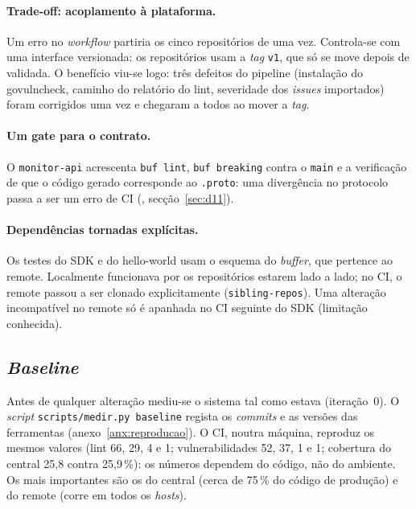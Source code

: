 \paragraph{Trade-off: acoplamento à plataforma.}
Um erro no \emph{workflow} partiria os cinco repositórios de uma vez. Controla-se com uma interface versionada:
os repositórios usam a \emph{tag} \texttt{v1}, que só se move depois de validada. O benefício viu-se logo: três
defeitos do pipeline (instalação do govulncheck, caminho do relatório do lint, severidade dos \emph{issues}
importados) foram corrigidos uma vez e chegaram a todos ao mover a \emph{tag}.

\paragraph{Um gate para o contrato.}
O \texttt{monitor-api} acrescenta \texttt{buf lint}, \texttt{buf breaking} contra o \texttt{main} e a verificação
de que o código gerado corresponde ao \texttt{.proto}: uma divergência no protocolo passa a ser um erro de CI
(, secção~\ref{sec:d11}).

\paragraph{Dependências tornadas explícitas.}
Os testes do SDK e do hello-world usam o esquema do \emph{buffer}, que pertence ao remote. Localmente funcionava
por os repositórios estarem lado a lado; no CI, o remote passou a ser clonado explicitamente
(\texttt{sibling-repos}). Uma alteração incompatível no remote só é apanhada no CI seguinte do SDK (limitação
conhecida).

\subsection{\emph{Baseline}}
\label{sec:baseline}

Antes de qualquer alteração mediu-se o sistema tal como estava (iteração~0). O \emph{script}
\texttt{scripts/medir.py baseline} regista os \emph{commits} e as versões das ferramentas
(anexo~\ref{anx:reproducao}). O CI, noutra máquina, reproduz os mesmos valores (lint 66, 29, 4 e 1; vulnerabilidades
52, 37, 1 e 1; cobertura do central 25,8 contra 25,9\,\%): os números dependem do código, não do ambiente. Os mais
importantes são os do central (cerca de 75\,\% do código de produção) e do remote (corre em todos os \emph{hosts}).

